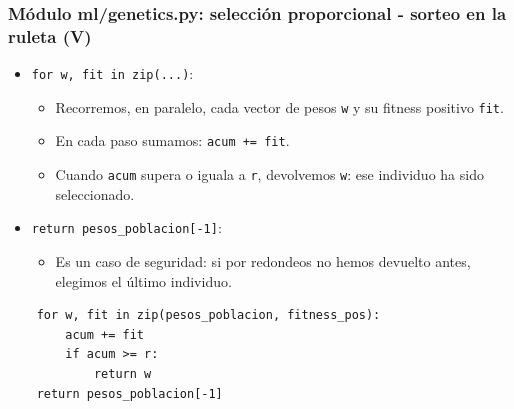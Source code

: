\documentclass[
	11pt, %
]{beamer}
\begin{document}

\begin{frame}[fragile]
\frametitle{Módulo ml/genetics.py: selección proporcional - sorteo en la ruleta (V)}

\begin{itemize}
    \item \texttt{for w, fit in zip(...)}:
    \begin{itemize}
        \item Recorremos, en paralelo, cada vector de pesos \texttt{w}
              y su fitness positivo \texttt{fit}.
        \item En cada paso sumamos: \texttt{acum += fit}.
        \item Cuando \texttt{acum} supera o iguala a \texttt{r},
              devolvemos \texttt{w}: ese individuo ha sido seleccionado.
    \end{itemize}
    \item \texttt{return pesos\_poblacion[-1]}:
    \begin{itemize}
        \item Es un caso de seguridad: si por redondeos no hemos devuelto antes,
              elegimos el último individuo.
    \end{itemize}
\end{itemize}

{\scriptsize
\begin{verbatim}
    for w, fit in zip(pesos_poblacion, fitness_pos):
        acum += fit
        if acum >= r:
            return w
    return pesos_poblacion[-1]
\end{verbatim}
}

\end{frame}

\end{document}
